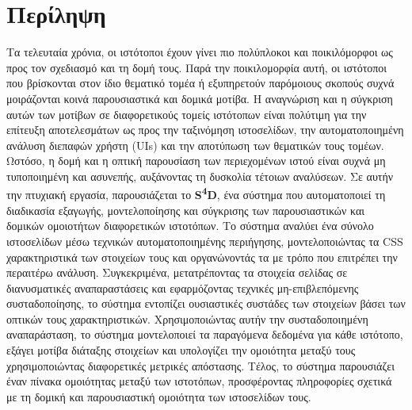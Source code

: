 \newpage
{}
\chapter*{Περίληψη}

Τα τελευταία χρόνια, οι ιστότοποι έχουν γίνει πιο πολύπλοκοι και ποικιλόμορφοι ως προς τον σχεδιασμό και τη δομή τους. Παρά την ποικιλομορφία αυτή, οι ιστότοποι που βρίσκονται στον ίδιο θεματικό τομέα ή εξυπηρετούν παρόμοιους σκοπούς συχνά μοιράζονται κοινά παρουσιαστικά και δομικά μοτίβα. Η αναγνώριση και η σύγκριση αυτών των μοτίβων σε διαφορετικούς τομείς ιστότοπων είναι πολύτιμη για την επίτευξη αποτελεσμάτων ως προς την ταξινόμηση ιστοσελίδων, την αυτοματοποιημένη ανάλυση διεπαφών χρήστη \textlatin{(UIs)} και την αποτύπωση των θεματικών τους τομέων. Ωστόσο, η δομή και η οπτική παρουσίαση των περιεχομένων ιστού είναι συχνά μη τυποποιημένη και ασυνεπής, αυξάνοντας τη δυσκολία τέτοιων αναλύσεων. Σε αυτήν την πτυχιακή εργασία, παρουσιάζεται το \textlatin{\textbf{S\textsuperscript{4}D}}, ένα σύστημα που αυτοματοποιεί τη διαδικασία εξαγωγής, μοντελοποίησης και σύγκρισης των παρουσιαστικών και δομικών ομοιοτήτων διαφορετικών ιστοτόπων. Το σύστημα αναλύει ένα σύνολο ιστοσελίδων μέσω τεχνικών αυτοματοποιημένης περιήγησης, μοντελοποιώντας τα \textlatin{CSS} χαρακτηριστικά των στοιχείων τους και οργανώνοντάς τα με τρόπο που επιτρέπει την περαιτέρω ανάλυση. Συγκεκριμένα, μετατρέποντας τα στοιχεία σελίδας σε διανυσματικές αναπαραστάσεις και εφαρμόζοντας τεχνικές μη-επιβλεπόμενης συσταδοποίησης, το σύστημα εντοπίζει ουσιαστικές συστάδες των στοιχείων βάσει των οπτικών τους χαρακτηριστικών. Χρησιμοποιώντας αυτήν την συσταδοποιημένη αναπαράσταση, το σύστημα μοντελοποιεί τα παραγόμενα δεδομένα για κάθε ιστότοπο, εξάγει μοτίβα διάταξης στοιχείων και υπολογίζει την ομοιότητα μεταξύ τους χρησιμοποιώντας διαφορετικές μετρικές απόστασης. Τέλος, το σύστημα παρουσιάζει έναν πίνακα ομοιότητας μεταξύ των ιστοτόπων, προσφέροντας πληροφορίες σχετικά με τη δομική και παρουσιαστική ομοιότητα των ιστοσελίδων τους.
